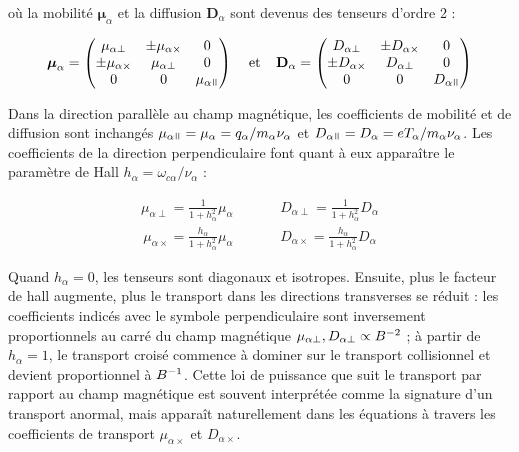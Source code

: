 \begin{refsection}
où la mobilité $\boldsymbol{\mu}_\alpha$ et la diffusion $\mathbf{D}_\alpha$
sont devenus des tenseurs d'ordre 2 :

\begin{align}
\boldsymbol{\mu}_\alpha =
 \begin{pmatrix}
  \mu_{\alpha\perp} & \pm\mu_{\alpha\times} & 0 \\
  \pm\mu_{\alpha\times} & \mu_{\alpha\perp} & 0 \\
  0  & 0  & \mu_{\alpha\para} 
 \end{pmatrix}\;\;\;\;\text{et}\;\;\;\;
 \mathbf D_\alpha =
 \begin{pmatrix}
  D_{\alpha\perp} & \pm D_{\alpha\times} & 0 \\
 \pm D_{\alpha\times} & D_{\alpha\perp} & 0 \\
  0  & 0  & D_{\alpha\para} 
 \end{pmatrix}
\end{align}

Dans la direction parallèle au champ magnétique, les coefficients de mobilité et
de diffusion sont inchangés
$\mu_{\alpha\para}=\mu_{\alpha}=q_\alpha/m_\alpha\nu_\alpha$ et
$D_{\alpha\para}=D_\alpha=eT_\alpha/m_\alpha\nu_\alpha$. Les coefficients de la
direction perpendiculaire font quant à eux apparaître le paramètre de Hall
$h_\alpha=\omega_{c\alpha}/\nu_\alpha$ :

\begin{align}
\mu_{\alpha\perp}=\frac{1}{1+h_\alpha^2}\mu_\alpha\;\;\;\;\;\;\;\;
\;\;\;\;D_{\alpha\perp}=\frac{1}{1+h_\alpha^2}D_\alpha
\end{align}
\begin{align}
\mu_{\alpha\times}=\frac{h_\alpha}{1+h_\alpha^2}\mu_\alpha\;\;\;\;
\;\;\;\;\;\;\;\;D_{\alpha\times}=\frac{h_\alpha}{1+h_\alpha^2}D_\alpha
\end{align}

Quand $h_\alpha=0$, les tenseurs sont diagonaux et isotropes. Ensuite, plus le
facteur de hall augmente, plus le transport dans les directions transverses se
réduit :
les coefficients indicés avec le symbole perpendiculaire sont inversement
proportionnels au carré du champ magnétique $\mu_{\alpha\perp},
D_{\alpha\perp}\propto B^{{-2}}$ ; à partir de $h_\alpha=1$, le
transport croisé commence à dominer sur le transport collisionnel et devient proportionnel à
$B^{{-1}}$. Cette loi de puissance que suit le transport par rapport au
champ magnétique est souvent interprétée comme la signature d'un transport
anormal, mais apparaît naturellement dans les équations à travers les
coefficients de transport $\mu_{\alpha\times}$ et $D_{\alpha\times}$.



\end{refsection}
